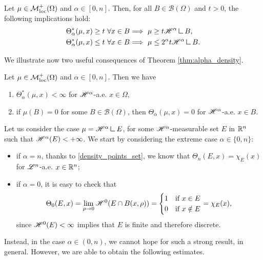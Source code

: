 \begin{theorem} \label{thm:alpha_density}
Let $\mu \in \mathcal{M}^{+}_{\rm loc}(\Omega)$ and $\alpha \in [0, n]$. Then, for all $B \in \mathcal{B}(\Omega)$ and $t > 0$, the following implications hold:
\begin{align}
\Theta^{*}_{\alpha}(\mu, x) \ge t \ \forall x \in B & \Longrightarrow \ \mu \ge t \Haus{\alpha} \res B, \label{eq:lower_bound_density} \\
\Theta^{*}_{\alpha}(\mu, x) \le t \ \forall x \in B & \Longrightarrow \ \mu \le 2^{\alpha} t \Haus{\alpha} \res B. \label{eq:upper_bound_density}
\end{align}
\end{theorem}

We illustrate now two useful consequences of Theorem \ref{thm:alpha_density}.

\begin{corollary}
Let $\mu \in \mathcal{M}^{+}_{\rm loc}(\Omega)$ and $\alpha \in [0, n]$. Then we have
\begin{enumerate}
\item $\Theta^{*}_{\alpha}(\mu, x) < \infty$ for $\mathscr{H}^{\alpha}$-a.e. $x \in \Omega$,
\item if $\mu(B) = 0$ for some $B \in \mathcal{B}(\Omega)$, then $\Theta_{\alpha}(\mu, x) = 0$ for $\mathscr{H}^{\alpha}$-a.e. $x \in B$.
\end{enumerate}
\end{corollary}

Let us consider the case $\mu = \Haus{\alpha} \res E$, for some $\mathscr{H}^{\alpha}$-measurable set $E$ in $\mathbb{R}^{n}$ such that $\mathscr{H}^{\alpha}(E) < + \infty$. We start by considering the extreme case $\alpha \in \{0, n\}$:
\begin{itemize}
\item if $\alpha = n$, thanks to \eqref{density_points_set}, we know that $\Theta_{n}(E, x) = \chi_{E}(x)$ for $\mathscr{L}^{n}$-a.e. $x \in \mathbb{R}^{n}$; 
\item if $\alpha = 0$, it is easy to check that
\begin{equation*}
\Theta_{0}(E, x) = \lim_{\rho \to 0} \mathscr{H}^{0}(E \cap B(x, \rho)) = \begin{cases} 1 & \text{if} \ x \in E \\
0 & \text{if} \ x \notin E
\end{cases} = \chi_{E}(x),
\end{equation*} 
since $\mathscr{H}^{0}(E) < \infty$ implies that $E$ is finite and therefore discrete.
\end{itemize}
Instead, in the case $\alpha \in (0, n)$, we cannot hope for such a strong result, in general. However, we are able to obtain the following estimates.


